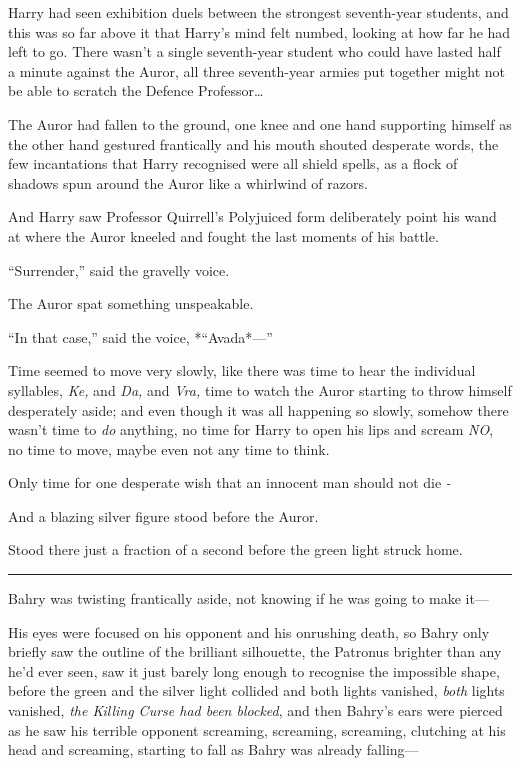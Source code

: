 Harry had seen exhibition duels between the strongest seventh-year
students, and this was so far above it that Harry's mind felt numbed,
looking at how far he had left to go. There wasn't a single seventh-year
student who could have lasted half a minute against the Auror, all three
seventh-year armies put together might not be able to scratch the
Defence Professor\ldots{}

The Auror had fallen to the ground, one knee and one hand supporting
himself as the other hand gestured frantically and his mouth shouted
desperate words, the few incantations that Harry recognised were all
shield spells, as a flock of shadows spun around the Auror like a
whirlwind of razors.

And Harry saw Professor Quirrell's Polyjuiced form deliberately point
his wand at where the Auror kneeled and fought the last moments of his
battle.

``Surrender,'' said the gravelly voice.

The Auror spat something unspeakable.

``In that case,'' said the voice, *``Avada*---''

Time seemed to move very slowly, like there was time to hear the
individual syllables, \emph{Ke,} and \emph{Da,} and \emph{Vra,} time to
watch the Auror starting to throw himself desperately aside; and even
though it was all happening so slowly, somehow there wasn't time to
\emph{do} anything, no time for Harry to open his lips and scream
\emph{NO}, no time to move, maybe even not any time to think.

Only time for one desperate wish that an innocent man should not die
\emph{-}

And a blazing silver figure stood before the Auror.

Stood there just a fraction of a second before the green light struck
home.

\begin{center}\rule{3in}{0.4pt}\end{center}

Bahry was twisting frantically aside, not knowing if he was going to
make it---

His eyes were focused on his opponent and his onrushing death, so Bahry
only briefly saw the outline of the brilliant silhouette, the Patronus
brighter than any he'd ever seen, saw it just barely long enough to
recognise the impossible shape, before the green and the silver light
collided and both lights vanished, \emph{both} lights vanished,
\emph{the Killing Curse had been blocked}, and then Bahry's ears were
pierced as he saw his terrible opponent screaming, screaming, screaming,
clutching at his head and screaming, starting to fall as Bahry was
already falling---

